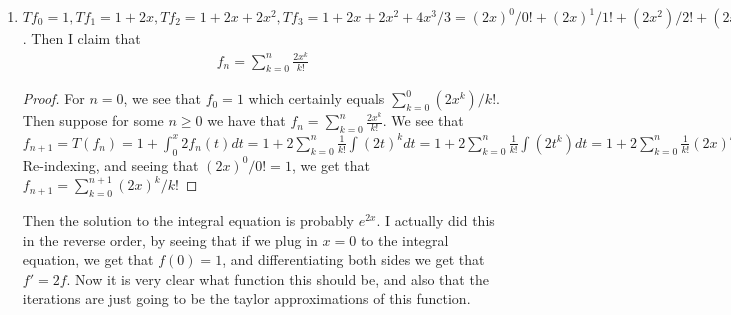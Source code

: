 \documentclass[12pt]{article}
\theoremstyle{definition}
\theoremstyle{remark}
\renewcommand{\qed}{\hfill\qedsymbol}
\begin{document}
\begin{enumerate}[leftmargin=\labelsep]
		Uniqueness: Suppose $f(y)=y$, for some $y \neq 0$. Then by the mean value theorem, there is some $c \in (\min(0, y), \max(0, y))$ so that $|y-0| = |f(y)-f(0)|=|f'(c)||(y-0)| < |y-0|$, a contradiction. 
		
		Consider the function 
		$$
			f(x) = 
			\begin{cases}
			x-\frac{x^3}{8N}, & |x| < \sqrt{8N}/3, \\
			\sqrt{8N}/3 - (\sqrt{8N}/3)^3/(8N), & |x| \geq \sqrt{8N}/3
			\end{cases}
	$$
	For clarity I will call $C = 8N$. We see that $f(2) = 2 - 2^3/C$. Then $f(f(2)) = (2 - 2^3/C) - 1/C(2-2^3/C)^3$. Note that $2-8/C$ is positive by construction, because the second term will never exceed $1$ (so it is in fact always greater than 1). Then because $-x^3$ is decreasing, if we plug a larger value into it we will get a smaller value, so this quantity is greater than $(2-2^3/C)-1/C \cdot 2^3 = 2 - 2 \cdot 2^3/C$. Note now that $f(x)$ is increasing on $|x| < C$, because the derivative is $0$ for the first time at $|x| = C$, and positive before that. So each value we are plugging in is going to be less than the actual value after $k$ compositions. We continue this process and see after $N$ steps we get that $f(f(...(2))) > 2 - 8N/8N = 1$. Note also that every composition before this would be $>$ than this value, by construction. $\qed$
	
	 \item 
	 $Tf_0 = 1, Tf_1 = 1 + 2x, Tf_2 = 1+2x+2x^2, Tf_3 = 1+2x+2x^2+4x^3/3 = (2x)^0/0! + (2x)^1/1! + (2x^2)/2! + (2x^3)/3!$. Then I claim that 
	 \begin{align}
		 	f_n = \sum_{k=0}^{n} \frac{2x^k}{k!}
	 \end{align}
	 \begin{proof}
		 	For $n = 0$, we see that $f_0 = 1$ which certainly equals $\sum_{k=0}^{0} (2x^k)/k!$. Then suppose for some $n \geq 0$ we have that $f_n = \sum_{k=0}^{n} \frac{2x^k}{k!}$. We see that $f_{n+1} = T(f_n) = 1 + \int_{0}^{x} 2f_n(t)dt = 1+2\sum_{k=0}^{n} \frac1{k!} \int (2t)^kdt = 1+2\sum_{k=0}^{n} \frac1{k!} \int (2t^k)dt = 1 + 2\sum_{k=0}^{n} \frac1{k!} (2x)^{k+1}/(2(k+1)) = 1 + \sum_{k=0}^{n} (2x)^{k+1}/(k+1)!$ Re-indexing, and seeing that $(2x)^0/0!=1$, we get that $f_{n+1} = \sum_{k=0}^{n+1} (2x)^k/k!$ 
	 \end{proof}
	 Then the solution to the integral equation is probably $e^{2x}$. I actually did this in the reverse order, by seeing that if we plug in $x = 0$ to the integral equation, we get that $f(0)=1$, and differentiating both sides we get that $f' = 2f$. Now it is very clear what function this should be, and also that the iterations are just going to be the taylor approximations of this function.
		\end{enumerate}
	
	
\end{document}
